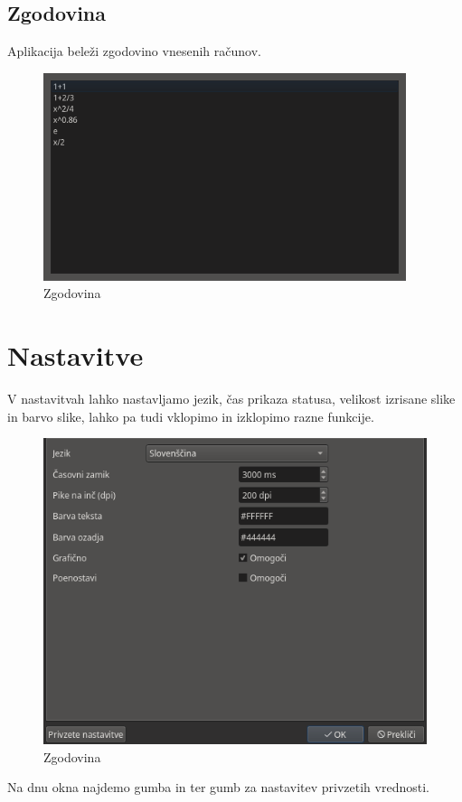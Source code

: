 \documentclass[12pt,titlepage]{report}
\begin{document}
		\parbox{\textwidth}{
			\subsection{Zgodovina}
			Aplikacija beleži zgodovino vnesenih računov.
			\begin{figure}[H]
				\centering
				\includegraphics[height=230px]{mw_hist.png}
				\caption{Zgodovina}
				\label{fig:mw_hist}
			\end{figure}}
	\parbox{\textwidth}{
	\section{Nastavitve}
		V nastavitvah lahko nastavljamo jezik, čas prikaza statusa, velikost izrisane slike in barvo slike, lahko pa tudi vklopimo in izklopimo razne funkcije.
		\begin{figure}[H]
			\centering
			\includegraphics{settings.png}
			\caption{Zgodovina}
			\label{fig:settings}
		\end{figure}
		Na dnu okna najdemo gumba  in  ter gumb za nastavitev privzetih vrednosti.}
\end{document}
